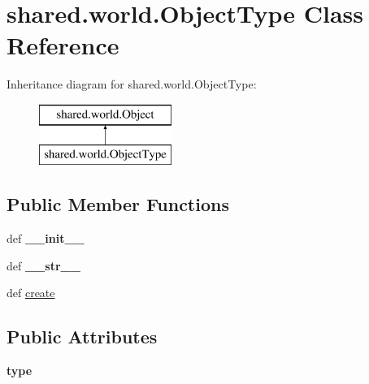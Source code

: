 \hypertarget{classshared_1_1world_1_1_object_type}{\section{shared.\-world.\-Object\-Type \-Class \-Reference}
\label{classshared_1_1world_1_1_object_type}
}
\-Inheritance diagram for shared.\-world.\-Object\-Type\-:\begin{figure}[H]
\begin{center}
\leavevmode
\includegraphics[height=2.000000cm]{classshared_1_1world_1_1_object_type}
\end{center}
\end{figure}
\subsection*{\-Public \-Member \-Functions}
\begin{DoxyCompactItemize}
\item 
\hypertarget{classshared_1_1world_1_1_object_type_a9530b36ba08c3e313e645672873eb05f}{def {\bfseries \-\_\-\-\_\-init\-\_\-\-\_\-}}\label{classshared_1_1world_1_1_object_type_a9530b36ba08c3e313e645672873eb05f}

\item 
\hypertarget{classshared_1_1world_1_1_object_type_a02e8370131a7b0a1861525c7f9754b20}{def {\bfseries \-\_\-\-\_\-str\-\_\-\-\_\-}}\label{classshared_1_1world_1_1_object_type_a02e8370131a7b0a1861525c7f9754b20}

\item 
def \hyperlink{classshared_1_1world_1_1_object_type_a4a9c776004001fde6b5ba855512f500c}{create}
\end{DoxyCompactItemize}
\subsection*{\-Public \-Attributes}
\begin{DoxyCompactItemize}
\item 
\hypertarget{classshared_1_1world_1_1_object_type_afa82ceeeaed82f359b85f58eb5365d9d}{{\bfseries type}}\label{classshared_1_1world_1_1_object_type_afa82ceeeaed82f359b85f58eb5365d9d}

\end{DoxyCompactItemize}


